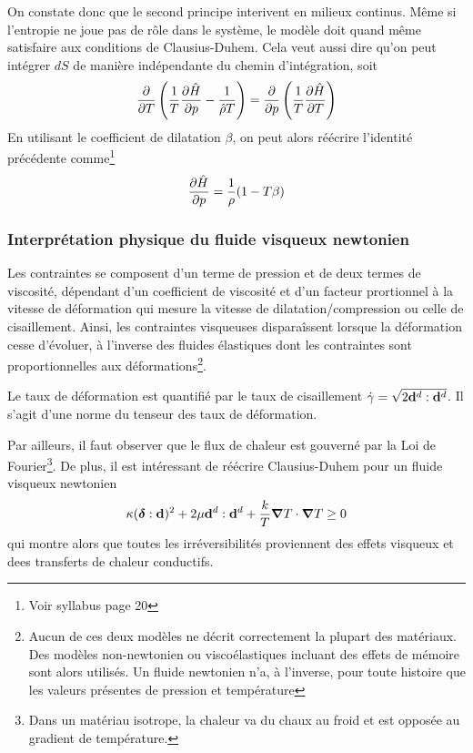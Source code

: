 \documentclass[a4paper,11pt]{report}
\newcommand{\bs}[1]{\boldsymbol{#1}}
\newcommand{\recip}[1]{\frac{1}{#1}}
\begin{document}
      On constate donc que le second principe interivent en milieux continus. Même si l'entropie ne joue pas de rôle dans le système, le modèle doit quand même satisfaire aux conditions de Clausius-Duhem. Cela veut aussi dire qu'on peut intégrer $dS$ de manière indépendante du chemin d'intégration, soit
      \begin{equation}
        \pdv{}{T}\left(\recip{T}\pdv{\hat{H}}{p} - \recip{\hat{\rho}T}\right) = \pdv{}{p}\left(\recip{T}\pdv{\hat{H}}{T}\right)
      \end{equation}
      En utilisant le coefficient de dilatation $\beta$, on peut alors réécrire l'identité précédente comme\footnote{Voir syllabus page 20}
      \begin{equation}
        \pdv{\hat{H}}{p} = \recip{\rho}(1-T\beta)\label{eq:dHdp=beta}
      \end{equation}

      \subsubsection{Interprétation physique du fluide visqueux newtonien}
        Les contraintes se composent d'un terme de pression et de deux termes de viscosité, dépendant d'un coefficient de viscosité et d'un facteur prortionnel à la vitesse de déformation qui mesure la vitesse de dilatation/compression ou celle de cisaillement. Ainsi, les contraintes visqueuses disparaîssent lorsque la déformation cesse d'évoluer, à l'inverse des fluides élastiques dont les contraintes sont proportionnelles aux déformations\footnote{Aucun de ces deux modèles ne décrit correctement la plupart des matériaux. Des modèles non-newtonien ou viscoélastiques incluant des effets de mémoire sont alors utilisés. Un fluide newtonien n'a, à l'inverse, pour toute histoire que les valeurs présentes de pression et température}.

        Le taux de déformation est quantifié par le taux de cisaillement $\dot{\gamma} = \sqrt{2\vb{d}^d:\vb{d}^d}$. Il s'agit d'une norme du tenseur des taux de déformation.

        Par ailleurs, il faut observer que le flux de chaleur est gouverné par la Loi de Fourier\footnote{Dans un matériau isotrope, la chaleur va du chaux au froid et est opposée au gradient de température.}. De plus, il est intéressant de réécrire Clausius-Duhem pour un fluide visqueux newtonien
        \begin{equation}
          \kappa (\bs{\delta}:\vb{d})^2 + 2 \mu \vb{d}^d : \vb{d}^d + \frac{k}{T}\grad T \cdot \grad T \geq 0
        \end{equation}
        qui montre alors que toutes les irréversibilités proviennent des effets visqueux et dees transferts de chaleur conductifs.
\end{document}
